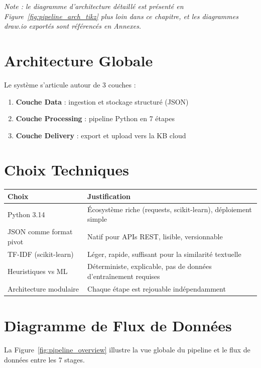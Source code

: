 \documentclass[12pt,a4paper]{report}
\begin{document}
\textit{Note : le diagramme d'architecture détaillé est présenté en Figure~\ref{fig:pipeline_arch_tikz} plus loin dans ce chapitre, et les diagrammes draw.io exportés sont référencés en Annexes.}

\section{Architecture Globale}

Le système s'articule autour de 3 couches :

\begin{enumerate}
  \item \textbf{Couche Data} : ingestion et stockage structuré (JSON)
  \item \textbf{Couche Processing} : pipeline Python en 7 étapes
  \item \textbf{Couche Delivery} : export et upload vers la KB cloud
\end{enumerate}

\section{Choix Techniques}

\begin{longtable}{p{4cm}p{9cm}}
\toprule
\textbf{Choix} & \textbf{Justification} \\
\midrule
Python 3.14 & Écosystème riche (requests, scikit-learn), déploiement simple \\
JSON comme format pivot & Natif pour APIs REST, lisible, versionnable \\
TF-IDF (scikit-learn) & Léger, rapide, suffisant pour la similarité textuelle \\
Heuristiques vs ML & Déterministe, explicable, pas de données d'entraînement requises \\
Architecture modulaire & Chaque étape est rejouable indépendamment \\
\bottomrule
\end{longtable}

\section{Diagramme de Flux de Données}

La Figure~\ref{fig:pipeline_overview} illustre la vue globale du pipeline et le flux de données entre les 7 stages.
\end{document}
